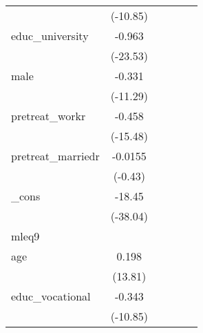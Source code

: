 {\begin{tabular}{l*{5}{c}}
            &    (-10.85)         &                     &                     &                     &                     \\
[1em]
educ\_university&      -0.963\sym{***}&                     &                     &                     &                     \\
            &    (-23.53)         &                     &                     &                     &                     \\
[1em]
male        &      -0.331\sym{***}&                     &                     &                     &                     \\
            &    (-11.29)         &                     &                     &                     &                     \\
[1em]
pretreat\_workr&      -0.458\sym{***}&                     &                     &                     &                     \\
            &    (-15.48)         &                     &                     &                     &                     \\
[1em]
pretreat\_marriedr&     -0.0155         &                     &                     &                     &                     \\
            &     (-0.43)         &                     &                     &                     &                     \\
[1em]
\_cons      &      -18.45\sym{***}&                     &                     &                     &                     \\
            &    (-38.04)         &                     &                     &                     &                     \\
\hline
mleq9       &                     &                     &                     &                     &                     \\
age         &       0.198\sym{***}&                     &                     &                     &                     \\
            &     (13.81)         &                     &                     &                     &                     \\
[1em]
educ\_vocational&      -0.343\sym{***}&                     &                     &                     &                     \\
            &    (-10.85)         &                     &                     &                     &                     \\

\end{tabular}}
